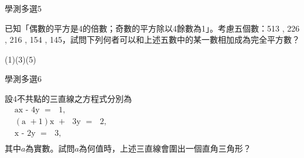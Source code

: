 \begin{QUESTIONS}
\begin{QUESTION}
\begin{ExamInfo}{87}{學測}{多選}{5}
        \end{ExamInfo}
        \begin{ExamAnsRateInfo}{}{}{}{}
        \end{ExamAnsRateInfo}
        \begin{QBODY}
            已知「偶數的平方是4的倍數；奇數的平方除以4餘數為1」。考慮五個數：513 , 226 , 216 , 154 , 145，試問下列何者可以和上述五數中的某一數相加成為完全平方數？
            \begin{QOPS}
            \end{QOPS}
            
        \end{QBODY}
        \begin{QFROMS}
        \end{QFROMS}
        \begin{QTAGS}\end{QTAGS}
        \begin{QANS}
            (1)(3)(5)
        \end{QANS}
        \begin{QSOLLIST}
        \end{QSOLLIST}
        \begin{QEMPTYSPACE}
        \end{QEMPTYSPACE}
    \end{QUESTION}
    \begin{QUESTION}
        \begin{ExamInfo}{87}{學測}{多選}{6}
        \end{ExamInfo}
        \begin{ExamAnsRateInfo}{}{}{}{}
        \end{ExamAnsRateInfo}
        \begin{QBODY}
            設4不共點的三直線之方程式分別為\\
            $\begin{aligned}
              & \text{ax - }4\text{y }=\text{ }1, \\ 
             & (\text{a }+1)\text{x }+\text{ }3\text{y }=\text{ }2, \\ 
             & \text{x - }2\text{y }=\text{ }3, \\ 
            \end{aligned}$\\
            其中$a$為實數。試問$a$為何值時，上述三直線會圍出一個直角三角形？
            \begin{QOPS}

\end{QOPS}
\end{QBODY}
\end{QUESTION}
\end{QUESTIONS}
